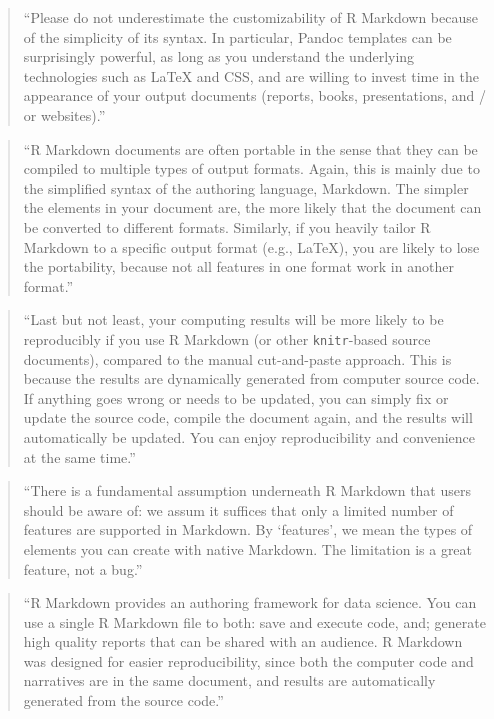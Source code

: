 \documentclass[]{tufte-book}
\begin{document}
\begin{quote}
``Please do not underestimate the customizability of R Markdown because of the
simplicity of its syntax. In particular, Pandoc templates can be surprisingly
powerful, as long as you understand the underlying technologies such as LaTeX and
CSS, and are willing to invest time in the appearance of your output
documents (reports, books, presentations, and / or websites).'' \citep{xie2018r}
\end{quote}

\begin{quote}
``R Markdown documents are often portable in the sense that they can be
compiled to multiple types of output formats. Again, this is mainly due to the
simplified syntax of the authoring language, Markdown. The simpler the elements
in your document are, the more likely that the document can be converted to
different formats. Similarly, if you heavily tailor R Markdown to a specific
output format (e.g., LaTeX), you are likely to lose the portability, because not
all features in one format work in another format.'' \citep{xie2018r}
\end{quote}

\begin{quote}
``Last but not least, your computing results will be more likely to be
reproducibly if you use R Markdown (or other \texttt{knitr}-based source documents),
compared to the manual cut-and-paste approach. This is because the results
are dynamically generated from computer source code. If anything goes wrong
or needs to be updated, you can simply fix or update the source code, compile
the document again, and the results will automatically be updated. You can
enjoy reproducibility and convenience at the same time.'' \citep{xie2018r}
\end{quote}

\begin{quote}
``There is a fundamental assumption underneath R Markdown that users should
be aware of: we assum it suffices that only a limited number of features are
supported in Markdown. By `features', we mean the types of elements you can
create with native Markdown. The limitation is a great feature, not a bug.''
\citep{xie2018r}
\end{quote}

\begin{quote}
``R Markdown provides an authoring framework for data science. You can use a
single R Markdown file to both: save and execute code, and; generate high
quality reports that can be shared with an audience. R Markdown was designed
for easier reproducibility, since both the computer code and narratives
are in the same document, and results are automatically
generated from the source code.'' \citep{xie2018r}
\end{quote}
\end{document}
